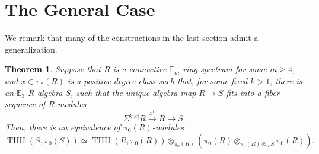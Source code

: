 \documentclass[11pt,leqno]{article}
\newcommand{\bb}[1]{\mathbb{#1}}
\DeclareMathOperator{\THH}{THH}
\newtheorem*{short hand}{theorem name}
\theoremstyle{plain}  %
\newtheorem{theorem}{Theorem}[section]
\theoremstyle{definition}
\numberwithin{equation}{section}
\begin{document}
\section{The General Case}
We remark that many of the constructions in the last section admit a generalization.
\begin{theorem}\label{th5.1}
 	Suppose that $R$ is a connective $\bb{E}_{m}$-ring spectrum for some $m\geq 4$, and $x\in \pi_{*}(R)$ is a positive degree class such that, for some fixed $k>1$, there is an $\bb{E}_3$-$R$-algebra $S$, such that the unique algebra map $R\to S$ fits into a fiber sequence of $R$-modules $$\Sigma^{k|x|}R\xrightarrow{x^k}R\to S.$$   Then, there is an equivalence of $\pi_0(R)$-modules $$\THH(S,\pi_0(S))\simeq \THH(R,\pi_0(R))\otimes_{\pi_0(R)}(\pi_0(R)\otimes_{\pi_0(R) \otimes_{R} S}\pi_0(R)).$$
\end{theorem}
\end{document}
